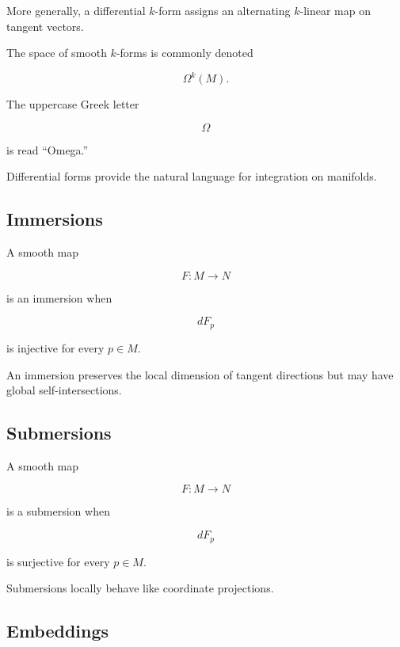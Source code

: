 More generally, a differential \(k\)-form assigns an alternating
\(k\)-linear map on tangent vectors.

The space of smooth \(k\)-forms is commonly denoted

\[
\boxed{
\Omega^k(M).
}
\]

The uppercase Greek letter

\[
\Omega
\]

is read ``Omega.''

Differential forms provide the natural language for integration on
manifolds.

\subsection{Immersions}
\label{subsec:manifold-immersions}

A smooth map

\[
F:M\to N
\]

is an immersion when

\[
\boxed{
dF_p
}
\]

is injective for every \(p\in M\).

An immersion preserves the local dimension of tangent directions but may
have global self-intersections.

\subsection{Submersions}
\label{subsec:manifold-submersions}

A smooth map

\[
F:M\to N
\]

is a submersion when

\[
\boxed{
dF_p
}
\]

is surjective for every \(p\in M\).

Submersions locally behave like coordinate projections.

\subsection{Embeddings}
\label{subsec:manifold-embeddings}

